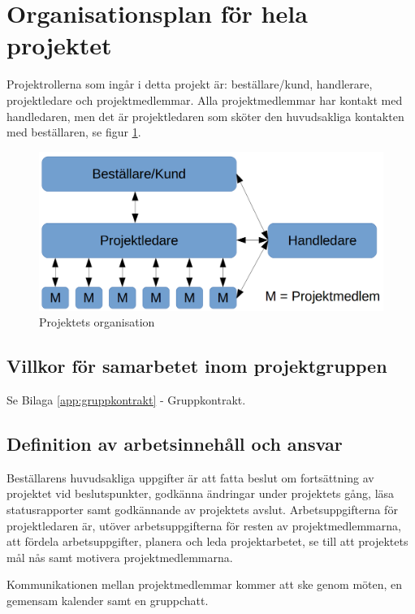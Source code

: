 \documentclass[a4paper,titlepage,12pt]{article}
\begin{document}
	
	\section{Organisationsplan för hela projektet}
	Projektrollerna som ingår i detta projekt är: beställare/kund, handlerare,
	projektledare och projektmedlemmar. Alla projektmedlemmar har kontakt med
    handledaren, men det är projektledaren som sköter den huvudsakliga
    kontakten med beställaren, se figur \ref{fig:organization}.

    \begin{figure}[h!]
        \begin{center}
		\includegraphics[width=0.8\linewidth]{images/projectroles.png}
        \caption{Projektets organisation \label{fig:organization}}
        \end{center}
	\end{figure}
	 
	\subsection{Villkor för samarbetet inom projektgruppen}
    Se Bilaga \ref{app:gruppkontrakt} - Gruppkontrakt.

	
	\subsection{Definition av arbetsinnehåll och ansvar}
    Beställarens huvudsakliga uppgifter är att fatta beslut
    om fortsättning av projektet vid beslutspunkter, godkänna
	ändringar under projektets gång, läsa statusrapporter samt godkännande av
	projektets avslut. Arbetsuppgifterna för projektledaren är, utöver
    arbetsuppgifterna för resten av projektmedlemmarna, att fördela
	arbetsuppgifter, planera och leda projektarbetet, se till att projektets mål
	nås samt motivera projektmedlemmarna.

    Kommunikationen mellan projektmedlemmar kommer att ske genom möten, en
    gemensam kalender samt en gruppchatt.
	
\end{document}
